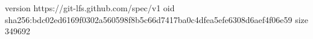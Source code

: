 version https://git-lfs.github.com/spec/v1
oid sha256:bdc02ed6169f0302a560598f8b5c66d7417ba0c4dfea5efe6308d6aef4f06e59
size 349692
